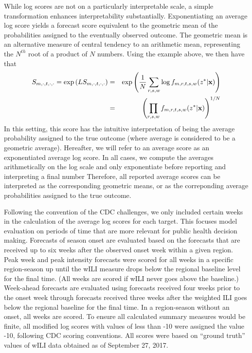 \documentclass{article}\usepackage[]{graphicx}\usepackage[]{color}
\begin{document}
While log scores are not on a particularly interpretable scale, a simple transformation enhances interpretability substantially.
Exponentiating an average log score yields a forecast score equivalent to the geometric mean of the probabilities assigned to the eventually observed outcome. 
The geometric mean is an alternative measure of central tendency to an arithmetic mean, representing the $N^{th}$ root of a product of $N$ numbers. 
Using the example above, we then have that
\begin{eqnarray}
S_{m,\cdot,t,\cdot,\cdot} = \exp \left ( LS_{m,\cdot,t,\cdot,\cdot} \right ) & = & \exp \left ( \frac{1}{N} \sum_{r,s,w} \log f_{m,r,t,s,w}(z^*|{\bf x}) \right ) \\
 & = & \left ( \prod_{r,s,w}  f_{m,r,t,s,w}(z^*|{\bf x}) \right ) ^{1/N} 
\end{eqnarray}
In this setting, this score has the intuitive interpretation of being the average probability assigned to the true outcome (where average is considered to be a geometric average).
Hereafter, we will refer to an average score as an exponentiated average log score.
In all cases, we compute the averages arithmetically on the log scale and only exponentiate before reporting and interpreting a final number
Therefore, all reported average scores can be interpreted as the corresponding geometric means, or as the correponding average probabilities assigned to the true outcome.

Following the convention of the CDC challenges, we only included certain weeks in the calculation of the average log scores for each target.
This focuses model evaluation on periods of time that are more relevant for public health decision making.
Forecasts of season onset are evaluated based on the forecasts that are received up to six weeks after the observed onset week within a given region.
Peak week and peak intensity forecasts were scored for all weeks in a specific region-season up until the wILI measure drops below the regional baseline level for the final time. 
(All weeks are scored if wILI never goes above the baseline.)
Week-ahead forecasts are evaluated using forecasts received four weeks prior to the onset week through forecasts received three weeks after the weighted ILI goes below the regional baseline for the final time.
In a region-season without an onset, all weeks are scored.
To ensure all calculated summary measures would be finite, all modified log scores with values of less than -10 were assigned the value -10, following CDC scoring conventions.
All scores were based on ``ground truth'' values of wILI data obtained as of September 27, 2017.
\end{document}
